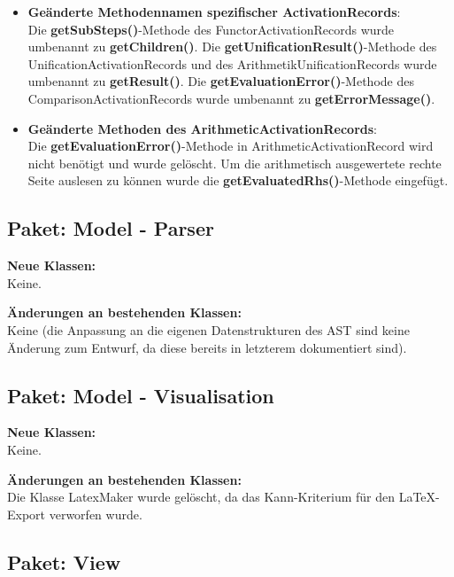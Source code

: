 \documentclass[parskip=full,11pt,twoside]{scrartcl}
\begin{document}
\begin{itemize}
	\item \textbf{Geänderte Methodennamen spezifischer ActivationRecords}:\\
	Die \textbf{getSubSteps()}-Methode des FunctorActivationRecords wurde umbenannt zu \textbf{getChildren()}. Die \textbf{getUnificationResult()}-Methode des UnificationActivationRecords und des ArithmetikUnificationRecords wurde umbenannt zu \textbf{getResult()}. Die \textbf{getEvaluationError()}-Methode des ComparisonActivationRecords wurde umbenannt zu \textbf{getErrorMessage()}.
	\item \textbf{Geänderte Methoden des ArithmeticActivationRecords}:\\
	Die \textbf{getEvaluationError()}-Methode in ArithmeticActivationRecord wird nicht benötigt und wurde gelöscht. Um die arithmetisch ausgewertete rechte Seite auslesen zu können wurde die \textbf{getEvaluatedRhs()}-Methode eingefügt.
\end{itemize}

\subsection{Paket: Model - Parser}

\textbf{Neue Klassen:}\\
Keine.

\textbf{Änderungen an bestehenden Klassen:}\\
Keine (die Anpassung an die eigenen Datenstrukturen des AST sind keine Änderung zum Entwurf, da diese bereits in letzterem dokumentiert sind).

\subsection{Paket: Model - Visualisation}

\textbf{Neue Klassen:}\\
Keine.

\textbf{Änderungen an bestehenden Klassen:}\\
Die Klasse LatexMaker wurde gelöscht, da das Kann-Kriterium für den LaTeX-Export verworfen wurde.

\subsection{Paket: View}
\end{document}
